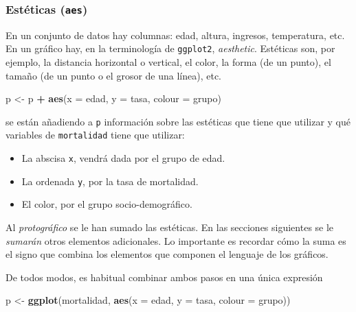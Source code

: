 \documentclass[]{article}
\newenvironment{Shaded}{\begin{snugshade}}{\end{snugshade}}
\newcommand{\DataTypeTok}[1]{\textcolor[rgb]{0.13,0.29,0.53}{#1}}
\newcommand{\KeywordTok}[1]{\textcolor[rgb]{0.13,0.29,0.53}{\textbf{#1}}}
\newcommand{\NormalTok}[1]{#1}
\newcommand{\OperatorTok}[1]{\textcolor[rgb]{0.81,0.36,0.00}{\textbf{#1}}}
\newcommand{\StringTok}[1]{\textcolor[rgb]{0.31,0.60,0.02}{#1}}
\providecommand{\tightlist}{%
  \setlength{\itemsep}{0pt}\setlength{\parskip}{0pt}}
\numberwithin{ejcnt}{section}
\begin{document}
\hypertarget{esteticas-aes}{%
\subsubsection{\texorpdfstring{Estéticas (\texttt{aes})}{Estéticas (aes)}}\label{esteticas-aes}}

En un conjunto de datos hay columnas: edad, altura, ingresos, temperatura, etc. En un gráfico hay, en la terminología de \texttt{ggplot2}, \emph{aesthetic}. Estéticas son, por ejemplo, la distancia horizontal o vertical, el color, la forma (de un punto), el tamaño (de un punto o el grosor de una línea), etc.

\begin{Shaded}
\begin{Highlighting}[]
\NormalTok{p <-}\StringTok{ }\NormalTok{p }\OperatorTok{+}\StringTok{ }\KeywordTok{aes}\NormalTok{(}\DataTypeTok{x =}\NormalTok{ edad, }\DataTypeTok{y =}\NormalTok{ tasa, }\DataTypeTok{colour =}\NormalTok{ grupo)}
\end{Highlighting}
\end{Shaded}

se están añadiendo a \texttt{p} información sobre las estéticas que tiene que utilizar y qué variables de \texttt{mortalidad} tiene que utilizar:

\begin{itemize}
\tightlist
\item
  La abscisa \texttt{x}, vendrá dada por el grupo de edad.
\item
  La ordenada \texttt{y}, por la tasa de mortalidad.
\item
  El color, por el grupo socio-demográfico.
\end{itemize}

Al \emph{protográfico} se le han sumado las estéticas. En las secciones siguientes se le \emph{sumarán} otros elementos adicionales. Lo importante es recordar cómo la suma es el signo que combina los elementos que componen el lenguaje de los gráficos.

De todos modos, es habitual combinar ambos pasos en una única expresión

\begin{Shaded}
\begin{Highlighting}[]
\NormalTok{p <-}\StringTok{ }\KeywordTok{ggplot}\NormalTok{(mortalidad, }\KeywordTok{aes}\NormalTok{(}\DataTypeTok{x =}\NormalTok{ edad, }\DataTypeTok{y =}\NormalTok{ tasa, }\DataTypeTok{colour =}\NormalTok{ grupo))}
\end{Highlighting}
\end{Shaded}
\end{document}
